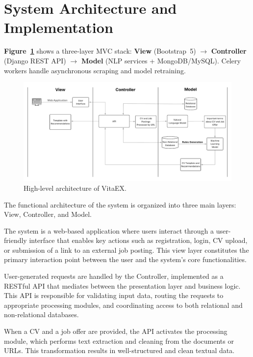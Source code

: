 \documentclass{svproc} %
\begin{document}
	
	\section{System Architecture and Implementation}
	
	\textbf{Figure~\ref{fig:blocks}} shows a three-layer MVC stack: \textbf{View} (Bootstrap~5) $\rightarrow$ \textbf{Controller} (Django REST API) $\rightarrow$ \textbf{Model} (NLP services + MongoDB/MySQL). Celery workers handle asynchronous scraping and model retraining.
	
	\begin{figure}
		\centering
		\includegraphics[width=1\linewidth]{imagenes/Arquitectura_Sistema.png}
		\caption{High-level architecture of VitaEX.}
		\label{fig:blocks}
	\end{figure}
	
	The functional architecture of the system is organized into three main layers: View, Controller, and Model.
	
	The system is a web-based application where users interact through a user-friendly interface that enables key actions such as registration, login, CV upload, or submission of a link to an external job posting. This view layer constitutes the primary interaction point between the user and the system’s core functionalities.
	
	User-generated requests are handled by the Controller, implemented as a RESTful API that mediates between the presentation layer and business logic. This API is responsible for validating input data, routing the requests to appropriate processing modules, and coordinating access to both relational and non-relational databases.
	
	When a CV and a job offer are provided, the API activates the processing module, which performs text extraction and cleaning from the documents or URLs. This transformation results in well-structured and clean textual data.
	
\end{document}
